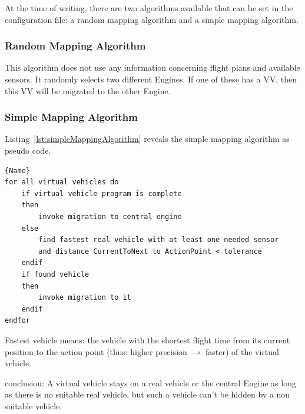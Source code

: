 At the time of writing, there are two algorithms available that can be set in the configuration file: a random
mapping algorithm and a simple mapping algorithm.

\subsubsection{Random Mapping Algorithm}
This algorithm does not use any information concerning flight plans and available sensors.
It randomly selects two different Engines. If one of these has a \ac{VV}, then this \ac{VV} will be
migrated to the other Engine.

\subsubsection{Simple Mapping Algorithm}


Listing~\ref{lst:simpleMappingAlgorithm} reveals the simple mapping algorithm as pseudo code. 

\lstset{tabsize=3,language=PseudoCode}
\begin{lstlisting}[caption={Simple Mapping Algorithm},mathescape=true,label=lst:simpleMappingAlgorithm]{Name}
for all virtual vehicles do
	if virtual vehicle program is complete
	then
		invoke migration to central engine
	else
		find fastest real vehicle with at least one needed sensor
		and distance CurrentToNext to ActionPoint < tolerance
	endif
	if found vehicle 
	then 
		invoke migration to it 
	endif
endfor
\end{lstlisting}

Fastest vehicle means: the vehicle with the shortest flight time from its current position to the action point (thus: higher precision \begin{math} \rightarrow \end{math} faster)
of the virtual vehicle. 

conclusion:
A virtual vehicle stays on a real vehicle or the central Engine as long as there is no suitable real vehicle, but such a vehicle can't 
be hidden by a non suitable vehicle.
